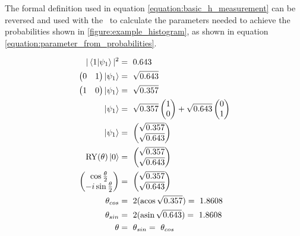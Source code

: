 The formal definition used in equation \ref{equation:basic_h_measurement} can be reversed and used with the \rygate\ to calculate the parameters needed to achieve the probabilities shown in \ref{figure:example_histogram}, as shown in equation \ref{equation:parameter_from_probabilities}. 

\begin{equation}
    \centering
    \begin{split}
        |\bra{1}\ket{\psi_1}|^2 &=\ 0.643 \\
        \begin{pmatrix}0 & 1\end{pmatrix}\ket{\psi_1} &=\ \sqrt{0.643} \\
        \begin{pmatrix}1 & 0\end{pmatrix}\ket{\psi_1} &=\ \sqrt{0.357} \\
        \ket{\psi_1} &=\ \sqrt{0.357}\begin{pmatrix} 1 \\ 0\end{pmatrix} + \sqrt{0.643}\begin{pmatrix} 0 \\ 1\end{pmatrix}\\
        \ket{\psi_1} &=\ \begin{pmatrix}\sqrt{0.357}\\ \sqrt{0.643}\end{pmatrix}\\
        \mathrm{RY}(\theta)\ket{0} &=\ \begin{pmatrix}\sqrt{0.357}\\ \sqrt{0.643}\end{pmatrix} \\
        \begin{pmatrix}\cos{\frac{\theta}{2}} \\ -i\sin{\frac{\theta}{2}}\end{pmatrix} &=\ \begin{pmatrix}\sqrt{0.357}\\ \sqrt{0.643}\end{pmatrix}\\
        \theta_{cos} &=\ 2(\acos{\sqrt{0.357}}) =\ 1.8608\\
        \theta_{sin} &=\ 2(\asin{\sqrt{0.643}}) =\ 1.8608\\
        \theta &=\ \theta_{sin} =\ \theta_{cos}\\
    \end{split}
    \label{equation:parameter_from_probabilities}
\end{equation}

